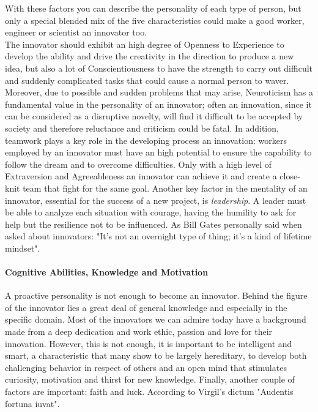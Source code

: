 With these factors you can describe the personality of each type of person, but only a special blended mix of the five characteristics could make a good worker, engineer or scientist an innovator too. \\ The innovator should exhibit an high degree of Openness to Experience to develop the ability and drive the creativity in the direction to produce a new idea, but also a lot of Conscientiousness to have the strength to carry out difficult and suddenly complicated tasks that could cause a normal person to waver. Moreover, due to possible and sudden problems that may arise, Neuroticism has a fundamental value in the personality of an innovator; often an innovation, since it can be considered as a disruptive novelty, will find it difficult to be accepted by society and therefore reluctance and criticism could be fatal. In addition, teamwork plays a key role in the developing process an innovation: workers employed by an innovator must have an high potential to ensure the capability to follow the dream and to overcome difficulties. Only with a high level of Extraversion and Agreeableness an innovator can achieve it and create a close-knit team that fight for the same goal. Another key factor in the mentality of an innovator, essential for the success of a new project, is \textit{leadership}. A leader must be able to analyze each situation with courage, having the humility to ask for help but the resilience not to be influenced\textsuperscript{\cite{CoraggioHBR}}. As Bill Gates personally said when asked about innovators: "It's not an overnight type of thing; it's a kind of lifetime mindset"\textsuperscript{\cite{BGLifetimeMindset}}.

\paragraph{Cognitive Abilities, Knowledge and Motivation}
A proactive personality is not enough to become an innovator. Behind the figure of the innovator lies a great deal of general knowledge and especially in the specific domain. Most of the innovators we can admire today have a background made from a deep dedication and work ethic, passion and love for their innovation. However, this is not enough, it is important to be intelligent and smart, a characteristic that many show to be largely hereditary\textsuperscript{\cite{DEARY2013R673}}, to develop both challenging behavior in respect of others and an open mind that stimulates curiosity, motivation and thirst for new knowledge. Finally, another couple of factors are important: faith and luck. According to Virgil's dictum "Audentis fortuna iuvat".